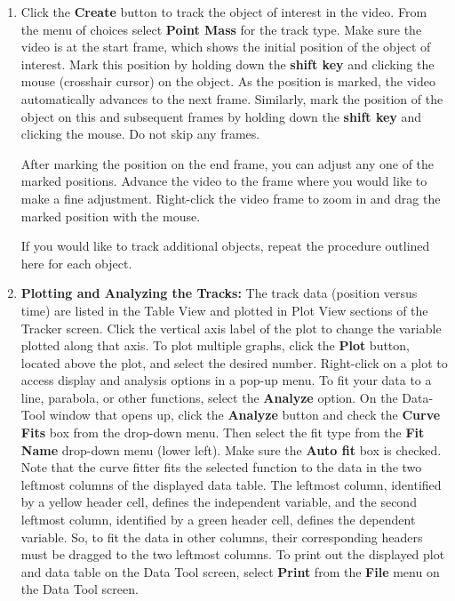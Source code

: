 \begin{enumerate}
\item Click the {\bf Create} button to track the object of interest in the video. 
From the menu of choices select {\bf Point Mass} for the track type. 
Make sure the video is at the start frame, which shows the initial position of the object of interest. 
Mark this position by holding down the {\bf shift key} and clicking the mouse (crosshair cursor) on the object. 
As the position is marked, the video automatically advances to the next frame. 
Similarly, mark the position of the object on this and subsequent frames by holding down the {\bf shift key} and clicking the mouse. 
Do not skip any frames. 

After marking the position on the end frame, you can adjust any one of the marked positions. 
Advance the video to the frame where you would like to make a fine adjustment. 
Right-click the video frame to zoom in and drag the marked position with the mouse.

If you would like to track additional objects, repeat the procedure outlined here for each object.

\item {\bf Plotting and Analyzing the Tracks:} The track data (position versus time) are listed in the Table View and plotted in Plot View sections of the Tracker screen. Click the vertical axis label of the plot to change the variable plotted along that axis. To plot multiple graphs, click the {\bf Plot} button, located above the plot, and select the desired number. 
Right-click on a plot to access display and analysis options in a pop-up menu. To fit your data to a line, parabola, or other functions, select the {\bf Analyze} option. On the Data-Tool window that opens up, click the {\bf Analyze} button and check the {\bf Curve Fits} box from the drop-down menu. Then select the fit type from the {\bf Fit Name} drop-down menu (lower left). Make sure the {\bf Auto fit} box is checked. 
Note that the curve fitter fits the selected function to the data in the two leftmost columns of the displayed data table. The leftmost column, identified by a yellow header cell, defines the independent variable, and the second leftmost column, identified by a green header cell, defines the dependent variable. So, to fit the data in other columns, their corresponding headers must be dragged to the two leftmost columns. To print out the displayed plot and data table on the Data Tool screen, select {\bf Print} from the {\bf File} menu on the Data Tool screen.


\end{enumerate}

